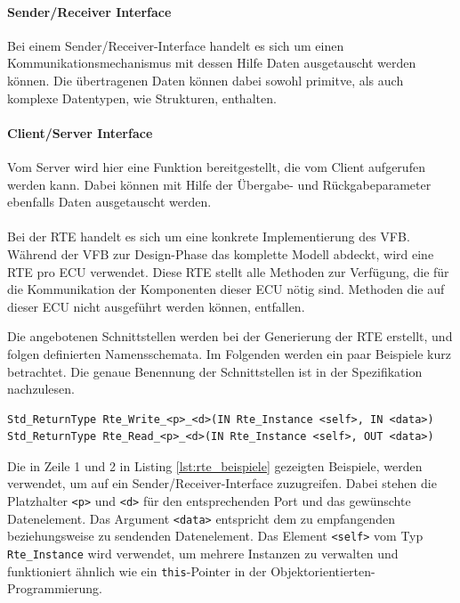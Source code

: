 \documentclass[
  a4paper,					    %
  twoside,
  DIV=calc,     				%
  bibliography=totoc,
  cleardoublepage=empty,
  ngerman,     					%
  final       					%
]{scrbook}
\begin{document}
\paragraph{Sender/Receiver Interface}
Bei einem Sender/Receiver-Interface handelt es sich um einen Kommunikationsmechanismus mit dessen Hilfe Daten ausgetauscht werden können. Die übertragenen Daten können dabei sowohl primitve, als auch komplexe Datentypen, wie Strukturen, enthalten.

\paragraph{Client/Server Interface}
Vom Server wird hier eine Funktion bereitgestellt, die vom Client aufgerufen werden kann. Dabei können mit Hilfe der Übergabe- und Rückgabeparameter ebenfalls Daten ausgetauscht werden.

\paragraph*{}
Bei der RTE handelt es sich um eine konkrete Implementierung des VFB. Während der VFB zur Design-Phase das komplette Modell abdeckt, wird eine RTE pro ECU verwendet. Diese RTE stellt alle Methoden zur Verfügung, die für die Kommunikation der Komponenten dieser ECU nötig sind. Methoden die auf dieser ECU nicht ausgeführt werden können, entfallen.

Die angebotenen Schnittstellen werden bei der Generierung der RTE erstellt, und folgen definierten Namensschemata. Im Folgenden werden ein paar Beispiele kurz betrachtet. Die genaue Benennung der Schnittstellen ist in der Spezifikation nachzulesen.

\begin{lstlisting}[frame=single, basicstyle=\footnotesize, caption={RTE Beispiele}, label={lst:rte_beispiele}]
Std_ReturnType Rte_Write_<p>_<d>(IN Rte_Instance <self>, IN <data>)
Std_ReturnType Rte_Read_<p>_<d>(IN Rte_Instance <self>, OUT <data>)
\end{lstlisting}

Die in Zeile 1 und 2 in Listing \ref{lst:rte_beispiele} gezeigten Beispiele, werden verwendet, um auf ein Sender/Receiver-Interface zuzugreifen. Dabei stehen die Platzhalter \texttt{<p>} und \texttt{<d>} für den entsprechenden Port und das gewünschte Datenelement. Das Argument \texttt{<data>} entspricht dem zu empfangenden beziehungsweise zu sendenden Datenelement. Das Element \texttt{<self>} vom Typ \texttt{Rte\_Instance} wird verwendet, um mehrere Instanzen zu verwalten und funktioniert ähnlich wie ein \texttt{this}-Pointer in der Objektorientierten-Programmierung.
\end{document}

